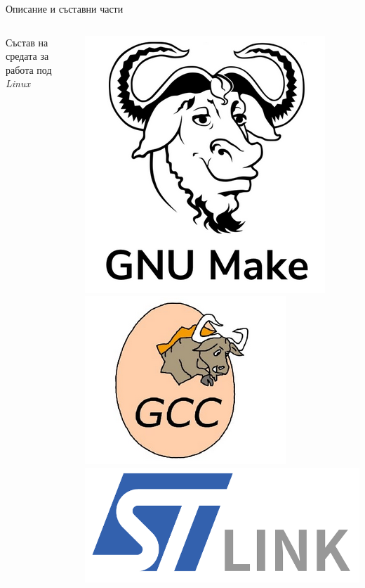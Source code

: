 \documentclass[handout]{beamer}
\begin{document}
\begin{frame}{Описание и съставни части}
\begin{columns}
\begin{block}{ Състав на средата за работа под \textit{Linux}}
\begin{itemize}
			\end{itemize}
		\end{block}
		\pause
			\includegraphics[width=0.95\linewidth]{Images/make.png} \\[0.5em]
			\includegraphics[width=0.95\linewidth]{Images/gcc.png}
			\includegraphics[width=0.95\linewidth]{Images/st-link.png} \\[0.5em]

\end{columns}
\end{frame}
\end{document}

